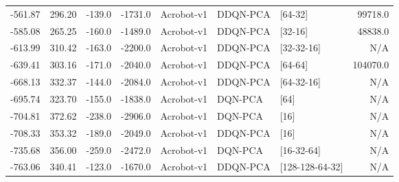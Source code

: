 \begin{tabular}{rrrrlllr}
-561.87 &  296.20 & -139.0 & -1731.0 &      Acrobot-v1 &  DDQN-PCA &          [64-32] &         99718.0 \\
-585.08 &  265.25 & -160.0 & -1489.0 &      Acrobot-v1 &  DDQN-PCA &          [32-16] &         48838.0 \\
-613.99 &  310.42 & -163.0 & -2200.0 &      Acrobot-v1 &  DDQN-PCA &       [32-32-16] &             N/A \\
-639.41 &  303.16 & -171.0 & -2040.0 &      Acrobot-v1 &  DDQN-PCA &          [64-64] &        104070.0 \\
-668.13 &  332.37 & -144.0 & -2084.0 &      Acrobot-v1 &  DDQN-PCA &       [64-32-16] &             N/A \\
-695.74 &  323.70 & -155.0 & -1838.0 &      Acrobot-v1 &   DQN-PCA &             [64] &             N/A \\
-704.81 &  372.62 & -238.0 & -2906.0 &      Acrobot-v1 &   DQN-PCA &             [16] &             N/A \\
-708.33 &  353.32 & -189.0 & -2049.0 &      Acrobot-v1 &  DDQN-PCA &             [16] &             N/A \\
-735.68 &  356.00 & -259.0 & -2472.0 &      Acrobot-v1 &   DQN-PCA &       [16-32-64] &             N/A \\
-763.06 &  340.41 & -123.0 & -1670.0 &      Acrobot-v1 &  DDQN-PCA &  [128-128-64-32] &             N/A \\
\bottomrule
\end{tabular}
